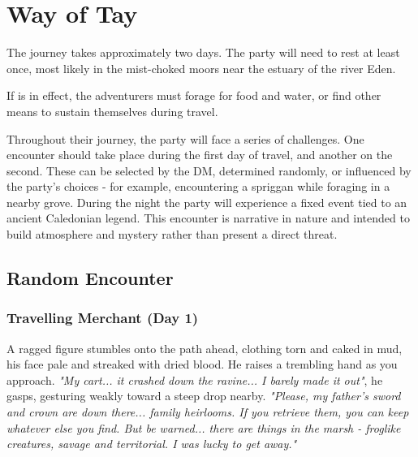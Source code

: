 \chapter*{Way of Tay}


{\entryfont The journey takes approximately two days. The party will need to rest at least once, most likely in the mist-choked moors near the estuary of the river Eden.

If  is in effect, the adventurers must forage for food and water, or find other means to sustain themselves during travel.

Throughout their journey, the party will face a series of challenges. One encounter should take place during the first day of travel, and another on the second. These can be selected by the DM, determined randomly, or influenced by the party's choices - for example, encountering a spriggan while foraging in a nearby grove. During the night the party will experience a fixed event tied to an ancient Caledonian legend. This encounter is narrative in nature and intended to build atmosphere and mystery rather than present a direct threat.}

\section*{Random Encounter}
\subsection*{Travelling Merchant (Day 1)}
\begin{DndReadAloud}
	A ragged figure stumbles onto the path ahead, clothing torn and caked in mud, his face pale and streaked with dried blood. He raises a trembling hand as you approach. \textit{"My cart... it crashed down the ravine... I barely made it out"}, he gasps, gesturing weakly toward a steep drop nearby. \textit{"Please, my father's sword and crown are down there... family heirlooms. If you retrieve them, you can keep whatever else you find. But be warned... there are things in the marsh - froglike creatures, savage and territorial. I was lucky to get away."}
\end{DndReadAloud}

